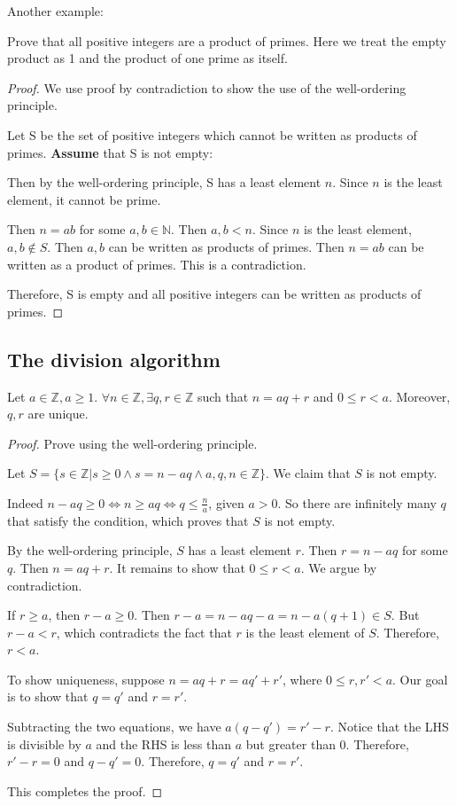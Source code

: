 \documentclass[letterpaper,12pt,oneside]{article}
\begin{document}
Another example:

Prove that all positive integers are a product of primes. Here we treat the
empty product as 1 and the product of one prime as itself.

\begin{proof}
    We use proof by contradiction to show the use of the well-ordering principle.

    Let S be the set of positive integers which cannot be written as products of
    primes. \textbf{Assume} that S is not empty:

    Then by the well-ordering principle, S has a least element $n$. Since $n$ is
    the least element, it cannot be prime.

    Then $n = ab$ for some $a, b \in \mathbb{N}$. Then $a, b < n$. Since $n$ is the
    least element, $a, b \notin S$. Then $a, b$ can be written as products of
    primes. Then $n = ab$ can be written as a product of primes. This is a
    contradiction.

    Therefore, S is empty and all positive integers can be written as products of
    primes.
\end{proof}
\subsection{The division algorithm}
Let $a\in \mathbb{Z}, a\ge 1$. $\forall n \in \mathbb{Z}, \exists q, r \in
    \mathbb{Z}$ such that $n = aq + r$ and $0 \leq r < a$. Moreover, $q, r$ are
unique.

\begin{proof}
    Prove using the well-ordering principle.

    Let $S = \{s \in \mathbb{Z} | s\ge 0 \land s=n-aq \land a,q,n \in
        \mathbb{Z}\}$. We claim that $S$ is not empty.

    Indeed $n-aq\ge0 \iff n\ge aq \iff q\le \frac{n}{a}$, given $a>0$. So there are
    infinitely many $q$ that satisfy the condition, which proves that $S$ is not
    empty.

    By the well-ordering principle, $S$ has a least element $r$. Then $r = n-aq$
    for some $q$. Then $n = aq + r$. It remains to show that $0 \leq r < a$. We
    argue by contradiction.

    If $r \ge a$, then $r-a \ge 0$. Then $r-a = n-aq-a = n-a(q+1) \in S$. But $r-a
        < r$, which contradicts the fact that $r$ is the least element of $S$.
    Therefore, $r < a$.

    To show uniqueness, suppose $n = aq + r = aq' + r'$, where $0 \leq r, r' < a$.
    Our goal is to show that $q = q'$ and $r = r'$.

    Subtracting the two equations, we have $a(q-q') = r' - r$. Notice that the LHS
    is divisible by $a$ and the RHS is less than $a$ but greater than 0. Therefore,
    $r' - r = 0$ and $q-q' = 0$. Therefore, $q = q'$ and $r = r'$.

    This completes the proof.
\end{proof}
\end{document}
